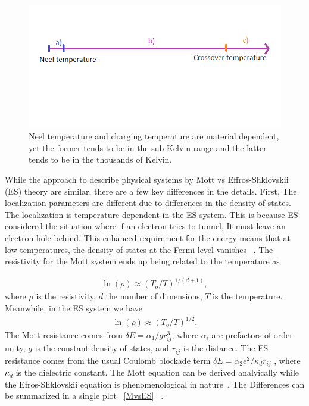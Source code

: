 \begin{figure}[htbp]
\begin{center}
\includegraphics[scale=.50]{temperature.png}
\caption{Neel temperature and charging temperature are material dependent, yet the former tends to be in the sub Kelvin range and the latter tends to be in the thousands of Kelvin.}
\label{temperature}
\end{center}
\end{figure}


While the approach to describe physical systems by Mott vs Effros-Shklovskii (ES) theory are similar, there are a few key differences in the details. First, The localization parameters are different due to differences in the density of states. The localization is temperature dependent in the ES system. This is because ES considered the situation where if an electron tries to tunnel, It must leave an electron hole behind. This enhanced requirement for the energy means that at low temperatures, the density of states at the Fermi level vanishes ~\cite{joung}. The resistivity for the Mott system ends up being related to the temperature as

\begin{eqnarray}
\ln(\rho) \approx (T_o / T)^{1/(d + 1)} ,
\label{fourth}
\end{eqnarray}
where $\rho$ is the resistivity, $d$ the number of dimensions, $T$ is the temperature. Meanwhile, in the ES system we have
\begin{eqnarray}
\ln(\rho) \approx (T_o / T)^{1/2}.
\label{half}
\end{eqnarray}
The Mott resistance comes from $\delta E = \alpha_1 / g r_{ij}^3 $, where $\alpha_i$ are prefactors of order unity, $g$ is the constant density of states, and $r_{ij}$ is the distance. The ES resistance comes from the usual Coulomb blockade term $\delta E = \alpha_2 e^2 / \kappa_d r_{ij}$ , where $\kappa_d$ is the dielectric constant. The Mott equation can be derived analyically while the Efros-Shklovskii equation is phenomenological in nature~\cite{aharony92}. The Differences can be summarized in a single plot ~\ref{MvsES} ~\cite{Liu10}.

